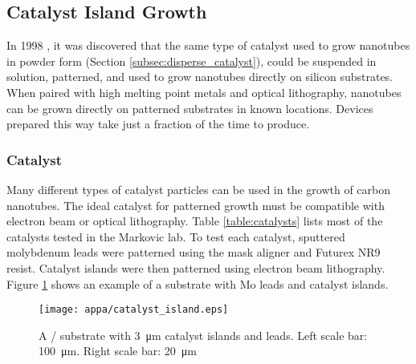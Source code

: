 \subsection{Catalyst Island Growth}
\label{subsec:catalyst_island}

In 1998 \cite{Kong1998a}, it was discovered that the same type of catalyst used to grow nanotubes in powder form (Section \ref{subsec:disperse_catalyst}), could be suspended in solution, patterned, and used to grow nanotubes directly on silicon substrates. When paired with high melting point metals and optical lithography, nanotubes can be grown directly on patterned substrates in known locations. Devices prepared this way take just a fraction of the time to produce. 

\subsubsection{Catalyst} 

Many different types of catalyst particles can be used in the growth of carbon nanotubes. The ideal catalyst for patterned growth must be compatible with electron beam or optical lithography. Table \ref{table:catalysts} lists most of the catalysts tested in the Markovic lab. To test each catalyst, sputtered molybdenum leads were patterned using the mask aligner and Futurex NR9 resist. Catalyst islands were then patterned using electron beam lithography. Figure \ref{fig:catalyst_islands} shows an example of a substrate with Mo leads and catalyst islands.

\begin{figure}
	\centering
	\texttt{[image: appa/catalyst\_island.eps]}
	\caption{A / substrate with \SI{3}{\micro\meter} catalyst islands and  leads. Left scale bar: \SI{100}{\micro\meter}. Right scale bar: \SI{20}{\micro\meter} }
	\label{fig:catalyst_islands}
\end{figure}

